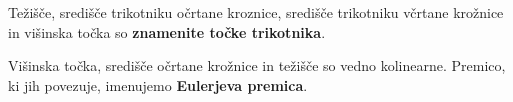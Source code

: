         \begin{frame}

            \begin{alertblock}{}
                Težišče, središče trikotniku očrtane kroznice, središče trikotniku včrtane krožnice in višinska točka so \textbf{znamenite točke trikotnika}.

            \end{alertblock}

            \pause
            \begin{alertblock}{}
                Višinska točka, središče očrtane krožnice in težišče so vedno kolinearne. Premico, ki jih povezuje, imenujemo \textbf{Eulerjeva premica}.
            \end{alertblock}


            \begin{figure}
\end{figure}
\end{frame}
